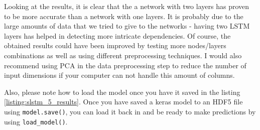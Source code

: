 \documentclass[12pt, a4paper]{article}
\begin{document}
Looking at the results, it is clear that the a network with two layers has proven to be more accurate than a network with one layers. It is probably due to the large amounts of data that we tried to give to the networks - having two LSTM layers has helped in detecting more intricate dependencies. Of course, the obtained results could have been improved by testing more nodes/layers combinations as well as using different preprocessing techniques. I would also recommend using PCA in the data preprocessing step to reduce the number of input dimensions if your computer can not handle this amount of columns.

Also, please note how to load the model once you have it saved in the listing \ref{listing:slstm_5_results}. Once you have saved a keras model to an HDF5 file using \texttt{model.save()}, you can load it back in and be ready to make predictions by using \texttt{load\_model()}.

\bgroup
  \inputminted[linenos, breaklines=true, fontsize=\scriptsize, firstnumber=last]{python}{src/stocks/lstm/5_results.py}
  \label{listing:slstm_5_results}
\egroup
\end{document}
